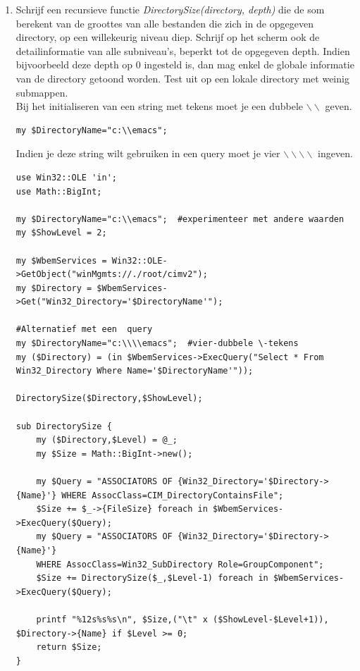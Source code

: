 \documentclass[11pt,a4paper]{report}
\begin{document}
\begin{enumerate}[resume]
\begin{lstlisting}
foreach my $Instance (in $Instances) {
	print "\n--------------------------------------------------------------\n";
	foreach my $prop (@toonprop){
		printf "\t%-15s : %s\n ",$prop, $Instance->{$prop};
	}

	# meer performante oplossing, vereist voorafgaande constructie %AntecendentHash en %DependentHash
	@Antecedent=@{$AntecedentHash{$Instance->{Name}}};
	@Dependent =@{$DependentHash{ $Instance->{Name}}};
		
	print "\t   Antecedent Services : " , (join ",",@Antecedent) , "\n";
	print "\t   Dependent  Services : " ,  (join ",",@Dependent) , "\n";
}
	\end{lstlisting}
	\item Schrijf een recursieve functie \textit{DirectorySize(directory, depth)} die de som berekent van de groottes van alle bestanden die zich in de opgegeven directory, op een willekeurig niveau diep. Schrijf op het scherm ook de detailinformatie van alle subniveau's, beperkt tot de opgegeven depth. Indien bijvoorbeeld deze depth op 0 ingesteld is, dan mag enkel de globale informatie van de directory getoond worden. Test uit op een lokale directory met weinig submappen.
	\\Bij het initialiseren van een string met \-tekens moet je een dubbele $\backslash\backslash$ geven.
	\begin{lstlisting}
my $DirectoryName="c:\\emacs";
	\end{lstlisting}
	Indien je deze string wilt gebruiken in een query moet je vier $\backslash\backslash\backslash\backslash$ ingeven.
	\begin{lstlisting}
use Win32::OLE 'in';
use Math::BigInt;

my $DirectoryName="c:\\emacs";  #experimenteer met andere waarden
my $ShowLevel = 2;

my $WbemServices = Win32::OLE->GetObject("winMgmts://./root/cimv2");
my $Directory = $WbemServices->Get("Win32_Directory='$DirectoryName'");

#Alternatief met een  query
my $DirectoryName="c:\\\\emacs";  #vier-dubbele \-tekens
my ($Directory) = (in $WbemServices->ExecQuery("Select * From Win32_Directory Where Name='$DirectoryName'"));

DirectorySize($Directory,$ShowLevel);

sub DirectorySize {
	my ($Directory,$Level) = @_;
	my $Size = Math::BigInt->new();
	
	my $Query = "ASSOCIATORS OF {Win32_Directory='$Directory->{Name}'} WHERE AssocClass=CIM_DirectoryContainsFile";
	$Size += $_->{FileSize} foreach in $WbemServices->ExecQuery($Query);
	my $Query = "ASSOCIATORS OF {Win32_Directory='$Directory->{Name}'} 
	WHERE AssocClass=Win32_SubDirectory Role=GroupComponent";
	$Size += DirectorySize($_,$Level-1) foreach in $WbemServices->ExecQuery($Query);
	
	printf "%12s%s%s\n", $Size,("\t" x ($ShowLevel-$Level+1)), $Directory->{Name} if $Level >= 0;
	return $Size;
}
	\end{lstlisting}
\end{enumerate}
\end{document}
